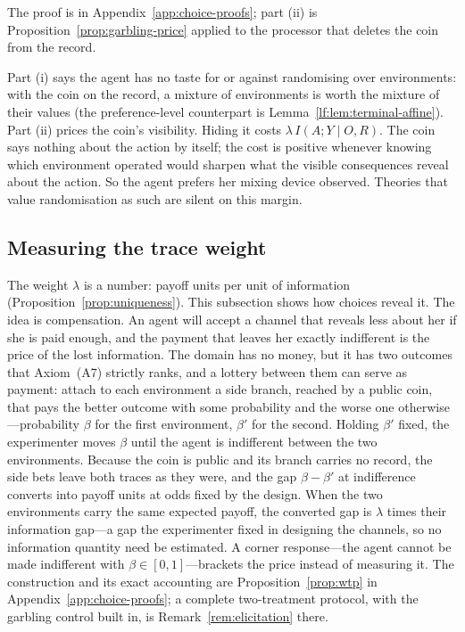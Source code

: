 \documentclass[11pt,a4paper]{article}
\theoremstyle{definition}
\newcommand{\I}{I}
\newcommand{\1}{\mathbf 1}
\begin{document}
The proof is in Appendix~\ref{app:choice-proofs}; part \textup{(ii)} is
Proposition~\ref{prop:garbling-price} applied to the processor that deletes the coin from the record.

Part \textup{(i)} says the agent has no taste for or against randomising over environments: with the coin on the
record, a mixture of environments is worth the mixture of their values (the preference-level counterpart is
Lemma~\ref{lf:lem:terminal-affine}).  Part \textup{(ii)} prices the coin's visibility.  Hiding it costs
$\lambda\,\I(A;Y\mid O,R)$.  The coin says nothing about the action by itself; the cost is positive whenever
knowing which environment operated would sharpen what the visible consequences reveal about the action.  So the
agent prefers her mixing device observed.  Theories that value randomisation as such are silent on this margin.

\subsection{Measuring the trace weight}\label{sec:measurement}

The weight $\lambda$ is a number: payoff units per unit of information (Proposition~\ref{prop:uniqueness}).
This subsection shows how choices reveal it.  The idea is compensation.  An agent will accept a channel that
reveals less about her if she is paid enough, and the payment that leaves her exactly indifferent is the price
of the lost information.  The domain has no money, but it has two outcomes that Axiom~\textup{(A7)} strictly
ranks, and a lottery between them can serve as payment: attach to each environment a side branch, reached by a
public coin, that pays the better outcome with some probability and the worse one otherwise---probability
$\beta$ for the first environment, $\beta'$ for the second.  Holding $\beta'$ fixed, the experimenter moves
$\beta$ until the agent is indifferent between the two environments.  Because the coin is public and its branch
carries no record, the side bets leave both traces as they were, and the gap $\beta-\beta'$ at indifference
converts into payoff units at odds fixed by the design.  When the two environments carry the same expected
payoff, the converted gap is $\lambda$ times their information gap---a gap the experimenter fixed in designing
the channels, so no information quantity need be estimated.  A corner response---the agent cannot be made
indifferent with $\beta\in[0,1]$---brackets the price instead of measuring it.  The construction and its
exact accounting are Proposition~\ref{prop:wtp} in Appendix~\ref{app:choice-proofs}; a complete two-treatment
protocol, with the garbling control built in, is Remark~\ref{rem:elicitation} there.
\end{document}
